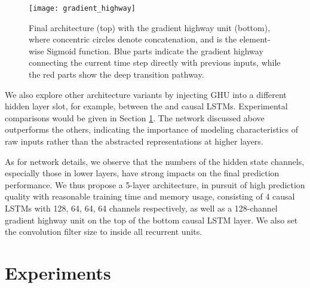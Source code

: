 \documentclass{article}
\begin{document}
\begin{figure}[t]
\vskip 0.15in
\centering
\texttt{[image: gradient\_highway]}
\caption{Final architecture (top) with the gradient highway unit (bottom), where concentric circles denote concatenation, and  is the element-wise Sigmoid function. Blue parts indicate the gradient highway connecting the current time step directly with previous inputs, while the red parts show the deep transition pathway.}
\label{fig:gradient_highway}
\end{figure}







We also explore other architecture variants by injecting GHU into a different hidden layer slot, for example, between the  and  causal LSTMs. Experimental comparisons would be given in Section \ref{sec:exp}. The network discussed above outperforms the others, indicating the importance of modeling characteristics of raw inputs rather than the abstracted representations at higher layers.






As for network details, we observe that the numbers of the hidden state channels, especially those in lower layers, have strong impacts on the final prediction performance. We thus propose a 5-layer architecture, in pursuit of high prediction quality with reasonable training time and memory usage, consisting of 4 causal LSTMs with 128, 64, 64, 64 channels respectively, as well as a 128-channel gradient highway unit on the top of the bottom causal LSTM layer. We also set the convolution filter size to  inside all recurrent units.









\section{Experiments}
\label{sec:exp}
\end{document}
